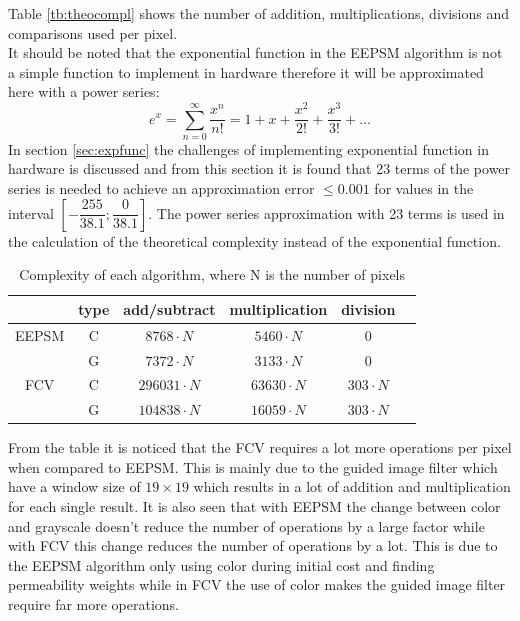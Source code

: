 Table \vref{tb:theocompl} shows the number of addition, multiplications, divisions and comparisons used per pixel. \\
It should be noted that the exponential function in the EEPSM algorithm is not a simple function to implement in hardware therefore it will be approximated here with a power series:
\begin{equation}
  e^x = \sum_{n=0}^{\infty} \dfrac{x^n}{n!} = 1 + x + \dfrac{x^2}{2!} + \dfrac{x^3}{3!} + \dots \label{eq:exppowser}
\end{equation}
In section \vref{sec:expfunc} the challenges of implementing exponential function in hardware is discussed and from this section it is found that 23 terms of the power series is needed to achieve an approximation error $\leq 0.001$ for values in the interval $[ -\dfrac{255}{38.1}; \dfrac{0}{38.1}]$. The power series approximation with 23 terms is used in the calculation of the theoretical complexity instead of the exponential function.
\begin{table}[ht!]
  \centering
  \begin{tabular}{c c c c c c}
    \toprule
    & type & add/subtract & multiplication & division \\
    \midrule
    EEPSM & C & $8768 \cdot N$ & $5460 \cdot N$ & $0$ \\
    & G & $7372 \cdot N$ & $3133 \cdot N$ & $0$ \\
    FCV & C & $296031 \cdot N$ & $63630 \cdot N$ & $303 \cdot N$ \\
    & G & $104838 \cdot N$ & $16059 \cdot N$ & $303 \cdot N$ \\
    \bottomrule
  \end{tabular}
  \caption{Complexity of each algorithm, where N is the number of pixels}
  \label{tb:theocompl}
\end{table}
From the table it is noticed that the FCV requires a lot more operations per pixel when compared to EEPSM. This is mainly due to the guided image filter which have a window size of $19\times 19$ which results in a lot of addition and multiplication for each single result. It is also seen that with EEPSM the change between color and grayscale doesn't reduce the number of operations by a large factor while with FCV this change reduces the number of operations by a lot. This is due to the EEPSM algorithm only using color during initial cost and finding permeability weights while in FCV the use of color makes the guided image filter require far more operations. \\

